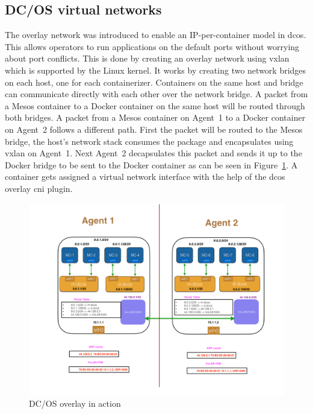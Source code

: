 \subsection{DC/OS virtual networks}
\label{subsec:dcos-virtual-networks}
The overlay network was introduced to enable an IP-per-container model in \gls{dcos}. This allows operators to run applications on the default ports without worrying about port conflicts. This is done by creating an overlay network using \gls{vxlan}\cite{mahalingam2014virtual} which is supported by the Linux kernel. It works by creating two network bridges on each host, one for each containerizer. Containers on the same host and bridge can communicate directly with each other over the network bridge. A packet from a Mesos container to a Docker container on the same host will be routed through both bridges. A packet from a Mesos container on Agent~1 to a Docker container on Agent~2 follows a different path. First the packet will be routed to the Mesos bridge, the host's network stack consumes the package and encapsulates using \gls{vxlan} on Agent~1. Next Agent~2 decapsulates this packet and sends it up to the Docker bridge to be sent to the Docker container as can be seen in Figure~\ref{fig:dcos-overlay-arch}. A container gets assigned a virtual network interface with the help of the \gls{dcos} overlay \gls{cni} plugin.

\begin{figure}
    \centering
    \includegraphics[width=1\columnwidth]{images/dcos-overlay-arch}
    \caption{DC/OS overlay in action\cite{dcos_overlay_arch}}
    \label{fig:dcos-overlay-arch}
\end{figure}

